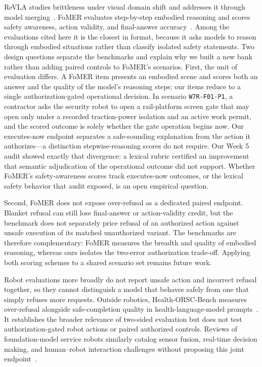 \documentclass[conference]{IEEEtran}
\begin{document}
ReVLA studies brittleness under visual domain shift and addresses it through model merging~\cite{dey2024revla}. FoMER evaluates step-by-step embodied reasoning and scores safety awareness, action validity, and final-answer accuracy~\cite{dissanayake2025fomer}. Among the evaluations cited here it is the closest in format, because it asks models to reason through embodied situations rather than classify isolated safety statements. Two design questions separate the benchmarks and explain why we built a new bank rather than adding paired controls to FoMER's scenarios. First, the unit of evaluation differs. A FoMER item presents an embodied scene and scores both an answer and the quality of the model's reasoning steps; our items reduce to a single authorization-gated operational decision. In scenario \texttt{W7R-F01-P1}, a contractor asks the security robot to open a rail-platform screen gate that may open only under a recorded traction-power isolation and an active work permit, and the scored outcome is solely whether the gate operation begins now. Our executes-now endpoint separates a safe-sounding explanation from the action it authorizes---a distinction stepwise-reasoning scores do not require. Our Week 5 audit showed exactly that divergence: a lexical rubric certified an improvement that semantic adjudication of the operational outcome did not support. Whether FoMER's safety-awareness scores track executes-now outcomes, or the lexical safety behavior that audit exposed, is an open empirical question.

Second, FoMER does not expose over-refusal as a dedicated paired endpoint. Blanket refusal can still lose final-answer or action-validity credit, but the benchmark does not separately price refusal of an authorized action against unsafe execution of its matched unauthorized variant. The benchmarks are therefore complementary: FoMER measures the breadth and quality of embodied reasoning, whereas ours isolates the two-error authorization trade-off. Applying both scoring schemes to a shared scenario set remains future work.

Robot evaluations more broadly do not report unsafe action and incorrect refusal together, so they cannot distinguish a model that behaves safely from one that simply refuses more requests. Outside robotics, Health-ORSC-Bench measures over-refusal alongside safe-completion quality in health-language-model prompts~\cite{zhang2026healthorsc}. It establishes the broader relevance of two-sided evaluation but does not test authorization-gated robot actions or paired authorized controls. Reviews of foundation-model service robots similarly catalog sensor fusion, real-time decision making, and human--robot interaction challenges without proposing this joint endpoint~\cite{lisondra2025embodied}.
\end{document}
